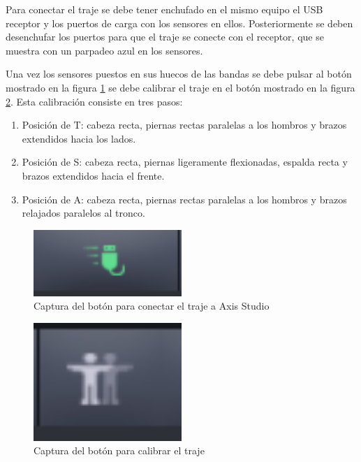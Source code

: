 Para conectar el traje se debe tener enchufado en el mismo equipo el USB receptor y los puertos de carga con los sensores en ellos.
Posteriormente se deben desenchufar los puertos para que el traje se conecte con el receptor, que se muestra con un parpadeo azul en los sensores.

Una vez los sensores puestos en sus huecos de las bandas se debe pulsar al botón mostrado en la figura \ref{fig:BotonConectar} se debe calibrar el traje en el botón mostrado en la figura \ref{fig:BotonCalibrar}.
Esta calibración consiste en tres pasos:
\begin{enumerate}
	\item Posición de T: cabeza recta, piernas rectas paralelas a los hombros y brazos extendidos hacia los lados.
	\item Posición de S: cabeza recta, piernas ligeramente flexionadas, espalda recta y brazos extendidos hacia el frente.
	\item Posición de A: cabeza recta, piernas rectas paralelas a los hombros y brazos relajados paralelos al tronco.
\end{enumerate}

\begin{figure}[H]
	\centering
	\includegraphics[width=0.5\textwidth]{Imagenes/Bitmap/ConectarTraje.PNG}
	\caption{Captura del botón para conectar el traje a Axis Studio}
	\label{fig:BotonConectar}
\end{figure}

\begin{figure}[H]
	\centering
	\includegraphics[width=0.5\textwidth]{Imagenes/Bitmap/Calibrar.PNG}
	\caption{Captura del botón para calibrar el traje}
	\label{fig:BotonCalibrar}
\end{figure}

